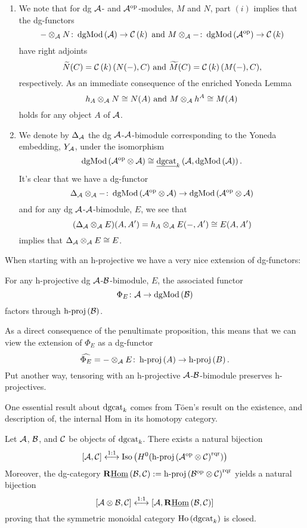 \begin{remark}\label{rem: tensoring with reps}
  \begin{enumerate}
  \item
    We note that for dg \(\mathcal{A}\)- and \(\mathcal{A}^{\operatorname{op}}\)-modules, \(M\) and \(N\), part \((i)\) implies that the dg-functors
    \[- \otimes_{\mathcal{A}} N \colon \operatorname{dgMod}\left(\mathcal{A}\right) \to \mathcal{C}\left(k\right)\ \text{and}\ M \otimes_{\mathcal{A}} - \colon \operatorname{dgMod}\left(\mathcal{A}^{\operatorname{op}}\right) \to \mathcal{C}\left(k\right)\]
    have right adjoints
    \[\widetilde{N}(C) = \CH{k}(N( - ), C)\ \text{and}\ \widetilde{M}(C) = \CH{k}(M( - ), C),\]
    respectively.
    As an immediate consequence of the enriched Yoneda Lemma
    \[h_A \otimes_{\mathcal{A}} N \cong N(A)\ \text{and}\ M \otimes_{\mathcal{A}} h^A \cong M(A)\]
    holds for any object \(A\) of \(\mathcal{A}\).
  \item
    We denote by \(\Delta_{\mathcal{A}}\) the dg \(\mathcal{A}\)-\(\mathcal{A}\)-bimodule corresponding to the Yoneda embedding, \(Y_{\mathcal{A}}\), under the isomorphism
    \[\operatorname{dgMod}\left(\mathcal{A}^{\operatorname{op}} \otimes \mathcal{A}\right) \cong \underline{\operatorname{dgcat}}_{k}\left(\mathcal{A}, \operatorname{dgMod}\left(\mathcal{A}\right)\right).\]
    It's clear that we have a dg-functor
    \[\Delta_{\mathcal{A}} \otimes_{\mathcal{A}} - \colon \operatorname{dgMod}\left(\mathcal{A}^{\operatorname{op}} \otimes \mathcal{A}\right) \to \operatorname{dgMod}\left(\mathcal{A}^{\operatorname{op}} \otimes \mathcal{A}\right)\]
    and for any dg \(\mathcal{A}\)-\(\mathcal{A}\)-bimodule, \(E\), we see that
    \[(\Delta_{\mathcal{A}} \otimes_{\mathcal{A}} E)(A,A^\prime) = h_A \otimes_{\mathcal{A}} E(- , A^\prime) \cong E(A,A^\prime)\]
    implies that \(\Delta_{\mathcal{A}} \otimes_{\mathcal{A}} E \cong E\).
  \end{enumerate}
\end{remark}

When starting with an h-projective we have a very nice extension of dg-functors:
\begin{proposition}[{\textcite[Lemma 3.4]{CS15}}]
  For any h-projective dg \(\mathcal{A}\)-\(\mathcal{B}\)-bimodule, \(E\), the associated functor
  \[\Phi_E \colon \mathcal{A} \to \operatorname{dgMod}\left(\mathcal{B}\right)\]
  factors through \(\operatorname{h-proj}\left(\mathcal{B}\right)\).
\end{proposition}

As a direct consequence of the penultimate proposition, this means that we can view the extension of \(\Phi_E\) as a dg-functor
\[\widehat{\Phi_E} = - \otimes_{\mathcal{A}} E \colon \operatorname{h-proj}\left(A\right) \to \operatorname{h-proj}\left(B\right).\]
Put another way, tensoring with an h-projective \(\mathcal{A}\)-\(\mathcal{B}\)-bimodule preserves h-projectives.

One essential result about \(\operatorname{dgcat}_k\) comes from T\"oen's result on the existence, and description of, the internal Hom in its homotopy category. 

\begin{theorem} \label{theorem: Toen}
  Let \(\mathcal{A}\), \(\mathcal{B}\), and \(\mathcal{C}\) be objects of \(\operatorname{dgcat}_k\).
  There exists a natural bijection
  \[[\mathcal{A},\mathcal{C}] \overset{1:1}\longleftrightarrow \operatorname{Iso}\left(H^0(\operatorname{h-proj}\left(\mathcal{A}^{{\operatorname{op}}} \otimes \mathcal{C}\right)^{\operatorname{rqr}})\right)\]
  Moreover, the dg-category \(\mathbf{R}\underline{\operatorname{Hom}}\left(\mathcal{B},\mathcal{C}\right) := \operatorname{h-proj}\left(\mathcal{B}^{\operatorname{op}} \otimes \mathcal{C}\right)^{\operatorname{rqr}}\) yields a natural bijection
  \[[\mathcal{A} \otimes \mathcal{B}, \mathcal{C}] \overset{1:1}\longleftrightarrow [\mathcal{A}, \mathbf{R}\underline{\operatorname{Hom}}\left(\mathcal{B},\mathcal{C}\right)]\]
  proving that the symmetric monoidal category \(\operatorname{Ho}\left(\operatorname{dgcat}_k\right)\) is closed.
\end{theorem}

